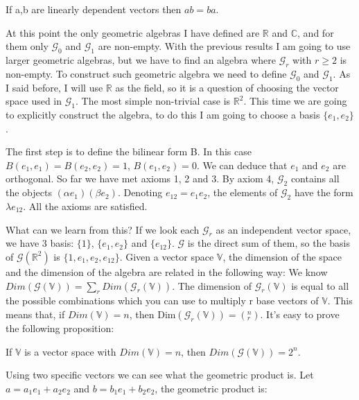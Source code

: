 \begin{corollary}
If a,b are linearly dependent vectors then $ab = ba$.
\end{corollary}

At this point the only geometric algebras I have defined are $\mathbb{R}$ and $\mathbb{C}$, and for them only $\mathcal{G}_0$ and $\mathcal{G}_1$ are non-empty. With the previous results I am going to use larger geometric algebras, but we have to find an algebra where $\mathcal{G}_r$ with $r \ge 2$ is non-empty. To construct such geometric algebra we need to define $\mathcal{G}_0$ and $\mathcal{G}_1$. As I said before, I will use $\mathbb{R}$ as the field, so it is a question of choosing the vector space used in  $\mathcal{G}_1$. The most simple non-trivial case is $\mathbb{R}^2$. This time we are going to explicitly construct the algebra, to do this I am going to choose a basis $\{e_1, e_2\}$.

The first step is to define the bilinear form B. In this case $B(e_1,e_1) = B(e_2,e_2) = 1$, $B(e_1,e_2) = 0$. We can deduce that $e_1$ and $e_2$ are orthogonal. So far we have met axioms 1, 2 and 3. By axiom 4, $\mathcal{G}_2$ contains all the objects $(\alpha e_1) (\beta e_2)$.  Denoting $e_{12} = e_1 e_2$, the elements of $\mathcal{G}_2$ have the form $\lambda e_{12}$. All the axioms are satisfied.

What can we learn from this? If we look each $\mathcal{G}_r$ as an independent vector space, we have 3 basis: $\{1\}$, $\{e_1, e_2\}$ and $\{e_{12}\}$. $\mathcal{G}$ is the direct sum of them, so the basis of $\mathcal{G}(\mathbb{R}^2)$ is $\{1, e_1, e_2, e_{12}\}$. Given a vector space $\mathbb{V}$, the dimension of the space and the dimension of the algebra are related in the following way: We know $Dim ( \mathcal{G}( \mathbb{V} ) ) = \sum_r Dim ( \mathcal{G}_r(\mathbb{V}) )$. The dimension of $\mathcal{G}_r(\mathbb{V})$ is equal to all the possible combinations which you can use to multiply r base vectors of $\mathbb{V}$. This means that, if $Dim(\mathbb{V}) = n$, then $\mbox{Dim} ( \mathcal{G}_r(\mathbb{V}) )= \left(_r^n\right)$. It's easy to prove the following proposition:

\begin{proposition}
If $\mathbb{V}$ is a vector space with $Dim (\mathbb{V}) = n$, then $Dim (\mathcal{G}(\mathbb{V})) = 2^n$.
\end{proposition}

Using two specific vectors we can see what the geometric product is. Let $a = a_1 e_1 + a_2 e_2$ and $b = b_1 e_1 + b_2 e_2$, the geometric product is:

